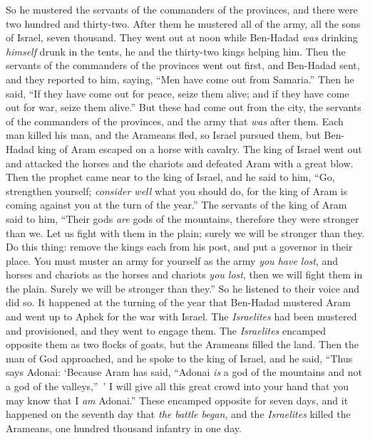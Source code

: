 \begin{biblechapter}
\verse So he mustered the servants of the commanders of the provinces, and there were two hundred and thirty-two. After them he mustered all of the army, all the sons of Israel, seven thousand.
\verse They went out at noon while Ben-Hadad \textit{was} drinking \textit{himself} drunk in the tents, he and the thirty-two kings helping him.
\verse Then the servants of the commanders of the provinces went out first, and Ben-Hadad sent, and they reported to him, saying, “Men have come out from Samaria.”
\verse Then he said, “If they have come out for peace, seize them alive; and if they have come out for war, seize them alive.”
\verse But these had come out from the city, the servants of the commanders of the provinces, and the army that \textit{was} after them.
\verse Each man killed his man, and the Arameans fled, so Israel pursued them, but Ben-Hadad king of Aram escaped on a horse with cavalry.
\verse The king of Israel went out and attacked the horses and the chariots and defeated Aram with a great blow.
\verse Then the prophet came near to the king of Israel, and he said to him, “Go, strengthen yourself; \textit{consider well} what you should do, for the king of Aram is coming against you at the turn of the year.”
\verse The servants of the king of Aram said to him, “Their gods \textit{are} gods of the mountains, therefore they were stronger than we. Let us fight with them in the plain; surely we will be stronger than they.
\verse Do this thing: remove the kings each from his post, and put a governor in their place.
\verse You must muster an army for yourself as the army \textit{you have lost}, and horses and chariots as the horses and chariots \textit{you lost}, then we will fight them in the plain. Surely we will be stronger than they.” So he listened to their voice and did so.
\verse It happened at the turning of the year that Ben-Hadad mustered Aram and went up to Aphek for the war with Israel.
\verse The \textit{Israelites} had been mustered and provisioned, and they went to engage them. The \textit{Israelites} encamped opposite them as two flocks of goats, but the Arameans filled the land.
\verse Then the man of God approached, and he spoke to the king of Israel, and he said, “Thus says Adonai: ‘Because Aram has said, “Adonai \textit{is} a god of the mountains and not a god of the valleys,” ’ I will give all this great crowd into your hand that you may know that I \textit{am} Adonai.”
\verse These encamped opposite for seven days, and it happened on the seventh day that \textit{the battle began}, and the \textit{Israelites} killed the Arameans, one hundred thousand infantry in one day.

\end{biblechapter}
